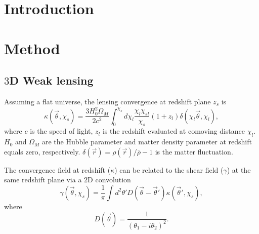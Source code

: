 \documentclass[twocolumn]{aastex62}
\begin{document}
\title{}


\begin{abstract}

\end{abstract}

\section{Introduction}


\section{Method}

\subsection{$3$D Weak lensing}

Assuming a flat universe, the lensing convergence at redshift plane $z_s$ is
\begin{equation}\label{lensing_1D_los_continue}
\kappa(\vec{\theta},\chi_s)=\frac{3H_0^2 \Omega_M}{2c^2} \int_0^{\chi_s} d\chi_l \frac{\chi_l \chi_{sl}}{\chi_s}(1+z_l) \delta(\chi_l\vec{\theta},\chi_l),
\end{equation}
where $c$ is the speed of light, $z_l$ is the redshift evaluated at comoving distance $\chi_l$. 
$H_0$ and $\Omega_M$ are the Hubble parameter and matter density parameter at redshift equals zero, respectively. 
$\delta(\vec{r})=\rho(\vec{r})/\bar{\rho}-1$ is the matter fluctuation.

The convergence field at redshift ($\kappa$) can be related to the shear field ($\gamma$) at the same redshift plane via a $2$D convolution
\begin{equation}\label{lensing_2D_tv_continue}
\gamma(\vec{\theta}, \chi_s)=\frac{1}{\pi} \int d^2 \theta' D(\vec{\theta}-\vec{\theta}') \kappa(\vec{\theta}',\chi_s),
\end{equation} 
where
\begin{equation}
D(\vec{\theta}) = \frac{1}{(\theta_1-i\theta_2)^2}.
\end{equation}
\end{document}
